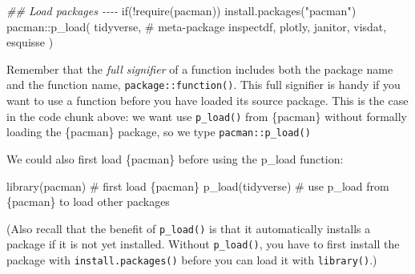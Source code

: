 \documentclass[
  letterpaper,
  DIV=11,
  numbers=noendperiod]{scrreprt}
\newenvironment{Shaded}{\begin{snugshade}}{\end{snugshade}}
\newcommand{\CommentTok}[1]{\textcolor[rgb]{0.37,0.37,0.37}{#1}}
\newcommand{\ControlFlowTok}[1]{\textcolor[rgb]{0.00,0.23,0.31}{#1}}
\newcommand{\DocumentationTok}[1]{\textcolor[rgb]{0.37,0.37,0.37}{\textit{#1}}}
\newcommand{\FunctionTok}[1]{\textcolor[rgb]{0.28,0.35,0.67}{#1}}
\newcommand{\NormalTok}[1]{\textcolor[rgb]{0.00,0.23,0.31}{#1}}
\newcommand{\SpecialCharTok}[1]{\textcolor[rgb]{0.37,0.37,0.37}{#1}}
\newcommand{\StringTok}[1]{\textcolor[rgb]{0.13,0.47,0.30}{#1}}
\begin{document}
\begin{Shaded}
\begin{Highlighting}[]
\DocumentationTok{\#\# Load packages {-}{-}{-}{-}}
\ControlFlowTok{if}\NormalTok{(}\SpecialCharTok{!}\FunctionTok{require}\NormalTok{(pacman)) }\FunctionTok{install.packages}\NormalTok{(}\StringTok{"pacman"}\NormalTok{)}
\NormalTok{pacman}\SpecialCharTok{::}\FunctionTok{p\_load}\NormalTok{(}
\NormalTok{  tidyverse, }\CommentTok{\# meta{-}package}
\NormalTok{  inspectdf,}
\NormalTok{  plotly,}
\NormalTok{  janitor,}
\NormalTok{  visdat,}
\NormalTok{  esquisse}
\NormalTok{)}
\end{Highlighting}
\end{Shaded}

\begin{tcolorbox}[enhanced jigsaw, colframe=quarto-callout-note-color-frame, rightrule=.15mm, opacityback=0, breakable, coltitle=black, colbacktitle=quarto-callout-note-color!10!white, bottomrule=.15mm, leftrule=.75mm, toprule=.15mm, arc=.35mm, bottomtitle=1mm, colback=white, left=2mm, opacitybacktitle=0.6, titlerule=0mm, title=\textcolor{quarto-callout-note-color}{\faInfo}\hspace{0.5em}{Reminder}, toptitle=1mm]

Remember that the \emph{full signifier} of a function includes both the
package name and the function name, \texttt{package::function()}. This
full signifier is handy if you want to use a function before you have
loaded its source package. This is the case in the code chunk above: we
want use \texttt{p\_load()} from \{pacman\} without formally loading the
\{pacman\} package, so we type \texttt{pacman::p\_load()}

We could also first load \{pacman\} before using the p\_load function:

\begin{Shaded}
\begin{Highlighting}[]
\FunctionTok{library}\NormalTok{(pacman) }\CommentTok{\# first load \{pacman\}}
\FunctionTok{p\_load}\NormalTok{(tidyverse) }\CommentTok{\# use \textasciigrave{}p\_load\textasciigrave{} from \{pacman\} to load other packages}
\end{Highlighting}
\end{Shaded}

(Also recall that the benefit of \texttt{p\_load()} is that it
automatically installs a package if it is not yet installed. Without
\texttt{p\_load()}, you have to first install the package with
\texttt{install.packages()} before you can load it with
\texttt{library()}.)

\end{tcolorbox}
\end{document}
